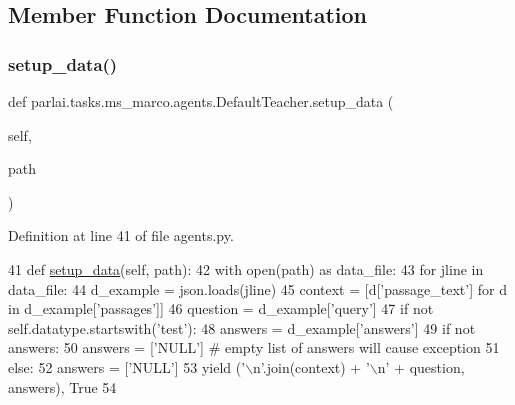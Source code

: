 \subsection{Member Function Documentation}
\mbox{\label{classparlai_1_1tasks_1_1ms__marco_1_1agents_1_1DefaultTeacher_aea8c65570701d5869ffe0494b4622f3b}} 
\subsubsection{\texorpdfstring{setup\+\_\+data()}{setup\_data()}}
{\footnotesize\ttfamily def parlai.\+tasks.\+ms\+\_\+marco.\+agents.\+Default\+Teacher.\+setup\+\_\+data (\begin{DoxyParamCaption}\item[{}]{self,  }\item[{}]{path }\end{DoxyParamCaption})}



Definition at line 41 of file agents.\+py.


\begin{DoxyCode}
41     \textcolor{keyword}{def }\hyperlink{namespaceparlai_1_1tasks_1_1multinli_1_1agents_a4fa2cb0ba1ed745336ad8bceed36b841}{setup\_data}(self, path):
42         with open(path) \textcolor{keyword}{as} data\_file:
43             \textcolor{keywordflow}{for} jline \textcolor{keywordflow}{in} data\_file:
44                 d\_example = json.loads(jline)
45                 context = [d[\textcolor{stringliteral}{'passage\_text'}] \textcolor{keywordflow}{for} d \textcolor{keywordflow}{in} d\_example[\textcolor{stringliteral}{'passages'}]]
46                 question = d\_example[\textcolor{stringliteral}{'query'}]
47                 \textcolor{keywordflow}{if} \textcolor{keywordflow}{not} self.datatype.startswith(\textcolor{stringliteral}{'test'}):
48                     answers = d\_example[\textcolor{stringliteral}{'answers'}]
49                     \textcolor{keywordflow}{if} \textcolor{keywordflow}{not} answers:
50                         answers = [\textcolor{stringliteral}{'NULL'}]  \textcolor{comment}{# empty list of answers will cause exception}
51                 \textcolor{keywordflow}{else}:
52                     answers = [\textcolor{stringliteral}{'NULL'}]
53                 \textcolor{keywordflow}{yield} (\textcolor{stringliteral}{'\(\backslash\)n'}.join(context) + \textcolor{stringliteral}{'\(\backslash\)n'} + question, answers), \textcolor{keyword}{True}
54 \end{DoxyCode}


